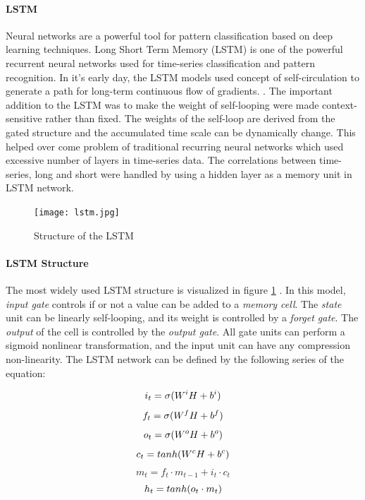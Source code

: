 \paragraph{LSTM} Neural networks are a powerful tool for pattern classification based on deep learning techniques. Long Short Term Memory (LSTM) is one of the powerful recurrent neural networks used for time-series classification and pattern recognition. In it's early day, the LSTM models used concept of self-circulation
to generate a path for long-term continuous flow of gradients. \cite{long_short_hochreiter}.  The important addition to the LSTM was to make the weight of self-looping were made context-sensitive rather than fixed. The weights of the self-loop are derived from the gated structure and the accumulated time scale can be dynamically change. This helped over come problem of traditional recurring neural networks which used excessive number of layers in time-series data. The correlations between time-series, long and short were handled by using a hidden layer as a memory unit in LSTM network. 

\begin{figure}
    \centering
    \texttt{[image: lstm.jpg]}
    \caption{Structure of the LSTM \cite{liu_td-lstm:_2018}}
    \label{fig:lstm_structure}
\end{figure}
\paragraph{LSTM Structure} The most widely used LSTM structure is visualized in figure \ref{fig:lstm_structure} \cite{liu_td-lstm:_2018}. In this model, \textit{input gate} controls if or not a value can be added to a \textit{memory cell}. The \textit{state} unit can be linearly self-looping, and its weight is controlled by a \textit{forget gate}. The \textit{output} of the cell is controlled by the \textit{output gate}. All gate units can perform a sigmoid nonlinear transformation, and the input unit can have any compression non-linearity. The LSTM network can be defined by the following series of the equation:

\begin{equation}
\label{eq:lstm_threshold}
    i_{t} = \sigma \small(W^iH + b^i)
\end{equation}
\begin{equation}
\label{eq:lstm_forget_gate}
    f_{t} = \sigma \small(W^fH + b^f)
\end{equation}
\begin{equation}
\label{eq:lstm_output_gate}
    o_{t} = \sigma \small(W^oH + b^o)
\end{equation}
\begin{equation}
\label{eq:lstm_new_state}
    c_{t} = tanh \small(W^cH + b^c)
\end{equation}
\begin{equation}
\label{eq:lstm_output}
    m_{t} = f_{t}\cdot m_{t-1} + i_{t}\cdot c_{t}
\end{equation}
\begin{equation}
\label{eq:lstm_6}
    h_{t} = tanh\small(o_{t}\cdot m_{t})
\end{equation}

